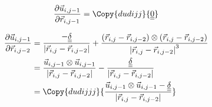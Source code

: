 \documentclass{article}
\renewcommand{\ij}{_{i,j}}
\newcommand{\ijj}{_{i,j-1}}
\newcommand{\ijk}{_{i,j-2}}
\newcommand{\ijjj}{_{i,j-2}}
\newcommand{\magn}[1]{\left\vert #1 \right\vert }
\renewcommand{\part}[2]{\frac{\partial #1 }{\partial #2}}
\newcommand{\partbig}[2]{\frac{\partial }{\partial #2}\left( #1 \right)}
\newcommand{\ten}[1]{\underline{\underline{#1}}}
\newcommand{\rij}{\vec{r} \ij}
\newcommand{\rijjj}{\vec{r} \ijjj}
\newcommand{\rijk}{\vec{r} \ijk}
\newcommand{\uijj}{\vec{u} \ijj}
\begin{document}
\begin{align*}
  \part{\vec{u} \ijj }{\vec{r} \ijj} = 
  \Copy{dudijj}{ \ten{0}}
\end{align*}

\begin{align*}
  \part{\vec{u} \ijj }{\vec{r} \ijk} 
  &=
     \frac{-\ten{\delta }}{\magn{\vec{r} \ij - \vec{r} \ijjj}} 
  +
  \frac{
    \left(\rij - \rijk \right)\otimes 
  \left(\rij - \rijk \right)
  }{
    \magn{\rij - \rijjj } ^3
    }
  \\
  & =
  \frac{\uijj \otimes \uijj}{\magn{\rij - \rijjj}}
  -
  \frac{\ten{\delta}}{\magn{\rij - \rijjj}} 
  \\
  &  =
  \Copy{dudijjj}
  {
  \frac{\uijj \otimes \uijj - \ten{\delta} }{\magn{\rij - \rijjj}}
  }
\end{align*}






\end{document}
